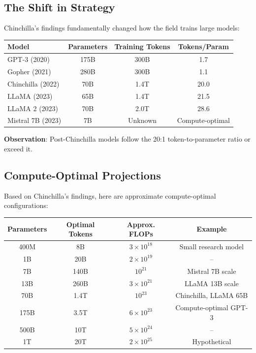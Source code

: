 \documentclass{article}
\begin{document}
\subsection{The Shift in Strategy}

Chinchilla's findings fundamentally changed how the field trains large models:

\begin{center}
\begin{tabular}{lccc}
\toprule
\textbf{Model} & \textbf{Parameters} & \textbf{Training Tokens} & \textbf{Tokens/Param} \\
\midrule
GPT-3 (2020) & 175B & 300B & 1.7 \\
Gopher (2021) & 280B & 300B & 1.1 \\
\midrule
Chinchilla (2022) & 70B & 1.4T & 20.0 \\
LLaMA (2023) & 65B & 1.4T & 21.5 \\
LLaMA 2 (2023) & 70B & 2.0T & 28.6 \\
Mistral 7B (2023) & 7B & Unknown & Compute-optimal \\
\bottomrule
\end{tabular}
\end{center}

\textbf{Observation}: Post-Chinchilla models follow the 20:1 token-to-parameter ratio or exceed it.

\subsection{Compute-Optimal Projections}

Based on Chinchilla's findings, here are approximate compute-optimal configurations:

\begin{center}
\begin{tabular}{cccc}
\toprule
\textbf{Parameters} & \textbf{Optimal Tokens} & \textbf{Approx. FLOPs} & \textbf{Example} \\
\midrule
400M & 8B & $3 \times 10^{18}$ & Small research model \\
1B & 20B & $2 \times 10^{19}$ & -- \\
7B & 140B & $10^{21}$ & Mistral 7B scale \\
13B & 260B & $3 \times 10^{21}$ & LLaMA 13B scale \\
70B & 1.4T & $10^{23}$ & Chinchilla, LLaMA 65B \\
175B & 3.5T & $6 \times 10^{23}$ & Compute-optimal GPT-3 \\
500B & 10T & $5 \times 10^{24}$ & -- \\
1T & 20T & $2 \times 10^{25}$ & Hypothetical \\
\bottomrule
\end{tabular}
\end{center}
\end{document}
